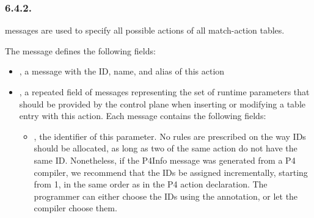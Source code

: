 \documentclass[11pt]{article}
\begin{document}
{%
\subsubsection{6.4.2.\hspace*{0.5em}}\label{sec-action}%

\noindent{} messages are used to specify all possible actions of all match-action
tables.%

The  message defines the following fields:%

\begin{itemize}%

\item{}
, a  message with the ID, name, and alias of this action%

\item{}
, a repeated field of  messages representing the set of runtime
parameters that should be provided by the control plane when inserting or
modifying a table entry with this action. Each  message contains the
following fields:%

\begin{itemize}[noitemsep,topsep=\mdcompacttopsep]%

\item{}, the  identifier of this parameter. No rules are prescribed
on the way  IDs should be allocated, as long as two  of the
same action do not have the same ID. Nonetheless, if the P4Info message
was generated from a P4 compiler, we recommend that the IDs be assigned
incrementally, starting from 1, in the same order as in the P4 action
declaration. The programmer can either choose the IDs using the 
annotation, or let the compiler choose them.%


\end{itemize}
\end{itemize}}
\end{document}
